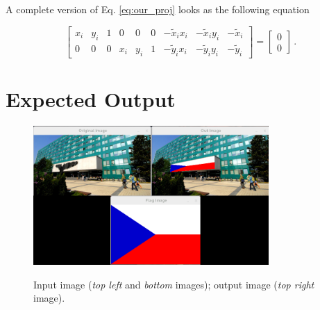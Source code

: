 \documentclass[12pt]{article}
\begin{document}
A complete version of Eq. \ref{eq:our_proj} looks as the following equation

\begin{equation}
    \label{eq:line_extended}
    \begin{bmatrix}
        x_i & y_i & 1 & 0   & 0   & 0 & -\tilde{x}_i x_i & -\tilde{x}_i y_i & -\tilde{x}_i \\
        0   & 0   & 0 & x_i & y_i & 1 & -\tilde{y}_i x_i & -\tilde{y}_i y_i & -\tilde{y}_i
    \end{bmatrix}
    =
    \begin{bmatrix}
        0 \\
        0
    \end{bmatrix}
    \, .
\end{equation}


\FloatBarrier
\section*{Expected Output}

\begin{figure}
    \centering
    \includegraphics[width=0.8\textwidth]{persp_proj.png}
    \label{fig:result}
    \caption{Input image (\textit{top left} and \textit{bottom} images); output image (\textit{top right} image).}
\end{figure}
\end{document}
